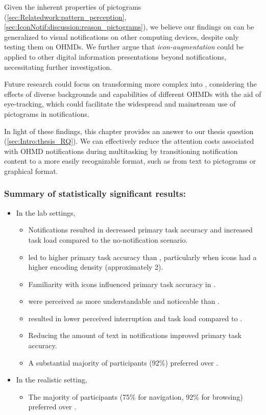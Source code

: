 Given the inherent properties of pictograms (\autoref{sec:Relatedwork:pattern_perception}, \autoref{sec:IconNotif:discussion:reason_pictograms}), we believe our findings on  can be generalized to visual notifications on other computing devices, despite only testing them on OHMDs. We further argue that \textit{icon-augmentation} could be applied to other digital information presentations beyond notifications, necessitating further investigation.

Future research could focus on transforming more complex  into , considering the effects of diverse backgrounds and capabilities of different OHMDs with the aid of eye-tracking, which could facilitate the widespread and mainstream use of pictograms in notifications.

In light of these findings, this chapter provides an answer to our thesis question (\autoref{sec:Intro:thesis_RQ}). We can effectively reduce the attention costs associated with OHMD notifications during multitasking by transitioning notification content to a more easily recognizable format, such as from text to pictograms or graphical format.


\subsubsection*{Summary of statistically significant results:}
{\small
\begin{itemize}
    \item In the lab settings, 
    \begin{itemize}
        \item Notifications resulted in decreased primary task accuracy and increased task load compared to the no-notification scenario.
        \item {} led to higher primary task accuracy than , particularly when icons had a higher encoding density (approximately 2).
        \item Familiarity with icons influenced primary task accuracy in .
        \item {} were perceived as more understandable and noticeable than .
        \item {} resulted in lower perceived interruption and task load compared to .
        \item Reducing the amount of text in notifications improved primary task accuracy.
        \item A substantial majority of participants (92\%) preferred  over .
    \end{itemize}
    \item In the realistic setting, 
    \begin{itemize}
        \item The majority of participants (75\% for navigation, 92\% for browsing) preferred  over .
    \end{itemize}
\end{itemize}
}